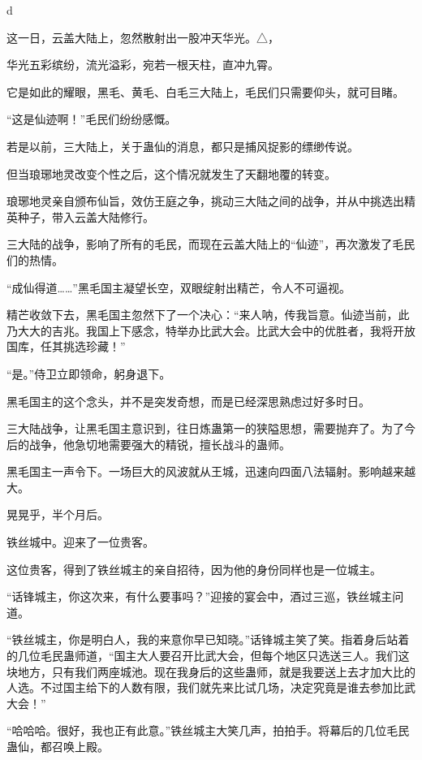 
\begin{this_body}

d

这一日，云盖大陆上，忽然散射出一股冲天华光。△，

华光五彩缤纷，流光溢彩，宛若一根天柱，直冲九霄。

它是如此的耀眼，黑毛、黄毛、白毛三大陆上，毛民们只需要仰头，就可目睹。

“这是仙迹啊！”毛民们纷纷感慨。

若是以前，三大陆上，关于蛊仙的消息，都只是捕风捉影的缥缈传说。

但当琅琊地灵改变个性之后，这个情况就发生了天翻地覆的转变。

琅琊地灵亲自颁布仙旨，效仿王庭之争，挑动三大陆之间的战争，并从中挑选出精英种子，带入云盖大陆修行。

三大陆的战争，影响了所有的毛民，而现在云盖大陆上的“仙迹”，再次激发了毛民们的热情。

“成仙得道……”黑毛国主凝望长空，双眼绽射出精芒，令人不可逼视。

精芒收敛下去，黑毛国主忽然下了一个决心：“来人呐，传我旨意。仙迹当前，此乃大大的吉兆。我国上下感念，特举办比武大会。比武大会中的优胜者，我将开放国库，任其挑选珍藏！”

“是。”侍卫立即领命，躬身退下。

黑毛国主的这个念头，并不是突发奇想，而是已经深思熟虑过好多时日。

三大陆战争，让黑毛国主意识到，往日炼蛊第一的狭隘思想，需要抛弃了。为了今后的战争，他急切地需要强大的精锐，擅长战斗的蛊师。

黑毛国主一声令下。一场巨大的风波就从王城，迅速向四面八法辐射。影响越来越大。

晃晃乎，半个月后。

铁丝城中。迎来了一位贵客。

这位贵客，得到了铁丝城主的亲自招待，因为他的身份同样也是一位城主。

“话锋城主，你这次来，有什么要事吗？”迎接的宴会中，酒过三巡，铁丝城主问道。

“铁丝城主，你是明白人，我的来意你早已知晓。”话锋城主笑了笑。指着身后站着的几位毛民蛊师道，“国主大人要召开比武大会，但每个地区只选送三人。我们这块地方，只有我们两座城池。现在我身后的这些蛊师，就是我要送上去才加大比的人选。不过国主给下的人数有限，我们就先来比试几场，决定究竟是谁去参加比武大会！”

“哈哈哈。很好，我也正有此意。”铁丝城主大笑几声，拍拍手。将幕后的几位毛民蛊仙，都召唤上殿。


\end{this_body}
